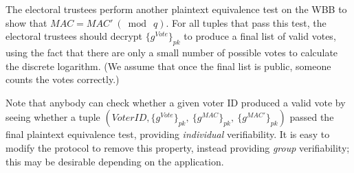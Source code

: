 \documentclass[12pt,a4paper]{article}
\theoremstyle{definition}
\newcommand{\Vote}{\mathit{Vote}}
\newcommand{\VoterID}{\mathit{VoterID}}
\newcommand{\Mac}{\mathit{MAC}}
\begin{document}
The electoral trustees perform another plaintext equivalence test on the WBB to show that $\Mac=\Mac'\ (\bmod\ q)$. For all tuples that pass this test, the electoral trustees should decrypt $\{g^\Vote\}_{pk}$ to produce a final list of valid votes, using the fact that there are only a small number of possible votes to calculate the discrete logarithm. (We assume that once the final list is public, someone counts the votes correctly.)

Note that anybody can check whether a given voter ID produced a valid vote by seeing whether a tuple $\left(\VoterID, \{g^{\Vote}\}_{pk},\ \{g^{\Mac}\}_{pk},\ \{g^{\Mac'}\}_{pk}\right)$ passed the final plaintext equivalence test, providing \textit{individual} verifiability. It is easy to modify the protocol to remove this property, instead providing \textit{group} verifiability; this may be desirable depending on the application.
\end{document}
